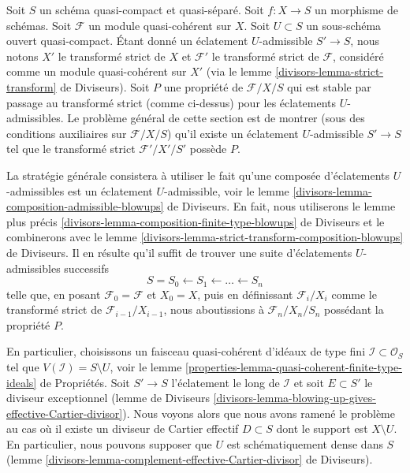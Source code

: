\begin{remark}
\label{remark-successive-blowups}
Soit $S$ un schéma quasi-compact et quasi-séparé. Soit $f : X \to S$
un morphisme de schémas. Soit $\mathcal{F}$ un module quasi-cohérent sur $X$.
Soit $U \subset S$ un sous-schéma ouvert quasi-compact. Étant donné un éclatement $U$-admissible
$S' \to S$, nous notons $X'$ le transformé strict de $X$ et $\mathcal{F}'$
le transformé strict de $\mathcal{F}$, considéré comme un module quasi-cohérent
sur $X'$ (via le lemme \ref{divisors-lemma-strict-transform} de Diviseurs).
Soit $P$ une propriété de $\mathcal{F}/X/S$ qui est stable par passage au transformé
strict (comme ci-dessus) pour les éclatements $U$-admissibles. Le problème général de
cette section est de montrer (sous des conditions auxiliaires sur $\mathcal{F}/X/S$)
qu'il existe un éclatement $U$-admissible $S' \to S$
tel que le transformé strict $\mathcal{F}'/X'/S'$ possède $P$.

\medskip\noindent
La stratégie générale consistera à utiliser le fait qu'une composée
d'éclatements $U$-admissibles est un éclatement $U$-admissible, voir le
lemme \ref{divisors-lemma-composition-admissible-blowups} de Diviseurs.
En fait, nous utiliserons le lemme plus précis
\ref{divisors-lemma-composition-finite-type-blowups} de Diviseurs
et le combinerons avec le
lemme \ref{divisors-lemma-strict-transform-composition-blowups} de Diviseurs.
Il en résulte qu'il suffit de trouver une suite d'éclatements $U$-admissibles
successifs
$$
S = S_0 \leftarrow S_1 \leftarrow \ldots \leftarrow S_n
$$
telle que, en posant $\mathcal{F}_0 = \mathcal{F}$ et $X_0 = X$, puis en définissant
$\mathcal{F}_i/X_i$ comme le transformé strict de
$\mathcal{F}_{i - 1}/X_{i - 1}$, nous
aboutissions à $\mathcal{F}_n/X_n/S_n$ possédant la propriété $P$.

\medskip\noindent
En particulier, choisissons un faisceau quasi-cohérent d'idéaux de type fini
$\mathcal{I} \subset \mathcal{O}_S$ tel que $V(\mathcal{I}) = S \setminus U$,
voir le lemme \ref{properties-lemma-quasi-coherent-finite-type-ideals} de Propriétés.
Soit $S' \to S$ l'éclatement le long de $\mathcal{I}$ et soit $E \subset S'$
le diviseur exceptionnel (lemme de Diviseurs
\ref{divisors-lemma-blowing-up-gives-effective-Cartier-divisor}).
Nous voyons alors que nous avons ramené le
problème au cas où il existe un diviseur de Cartier effectif
$D \subset S$ dont le support est $X \setminus U$. En particulier, nous pouvons
supposer que $U$ est schématiquement dense dans $S$
(lemme \ref{divisors-lemma-complement-effective-Cartier-divisor} de Diviseurs).


\end{remark}
